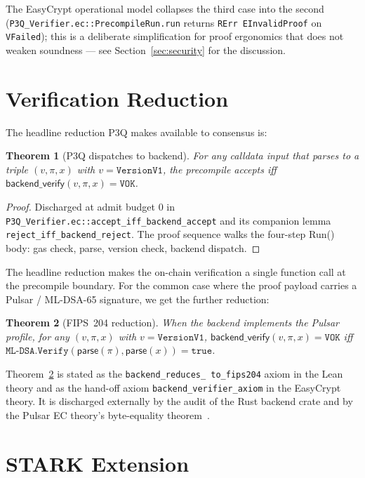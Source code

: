 \documentclass[11pt,a4paper]{article}
\newtheorem{theorem}{Theorem}
\begin{document}
The EasyCrypt operational model collapses the third case into the
second (\texttt{P3Q\_Verifier.ec::PrecompileRun.run} returns
\texttt{RErr EInvalidProof} on \texttt{VFailed}); this is a
deliberate simplification for proof ergonomics that does not
weaken soundness — see Section~\ref{sec:security} for the
discussion.

\section{Verification Reduction}\label{sec:reduction}

The headline reduction P3Q makes available to consensus is:

\begin{theorem}[P3Q dispatches to backend]\label{thm:dispatch}
For any calldata input that parses to a triple $(v, \pi, x)$ with
$v = \mathtt{VersionV1}$, the precompile accepts iff
$\mathsf{backend\_verify}(v, \pi, x) = \mathtt{VOK}$.
\end{theorem}

\begin{proof}
Discharged at admit budget $0$ in
\texttt{P3Q\_Verifier.ec::accept\_iff\_backend\_accept} and its
companion lemma \texttt{reject\_iff\_backend\_reject}. The proof
sequence walks the four-step Run() body: gas check, parse, version
check, backend dispatch.
\end{proof}

The headline reduction makes the on-chain verification a single
function call at the precompile boundary. For the common case where
the proof payload carries a Pulsar / ML-DSA-65 signature, we get the
further reduction:

\begin{theorem}[FIPS~204 reduction]\label{thm:fips204}
When the backend implements the Pulsar profile, for any
$(v, \pi, x)$ with $v = \mathtt{VersionV1}$,
$\mathsf{backend\_verify}(v, \pi, x) = \mathtt{VOK}$ iff
$\mathtt{ML\text{-}DSA.Verify}(\mathsf{parse}(\pi), \mathsf{parse}(x))
= \mathtt{true}$.
\end{theorem}

Theorem~\ref{thm:fips204} is stated as the \texttt{backend\_reduces\_
to\_fips204} axiom in the Lean theory and as the hand-off axiom
\texttt{backend\_verifier\_axiom} in the EasyCrypt theory. It is
discharged externally by the audit of the Rust backend crate and by
the Pulsar EC theory's byte-equality theorem~\cite{pulsar}.

\section{STARK Extension}\label{sec:stark}
\end{document}

